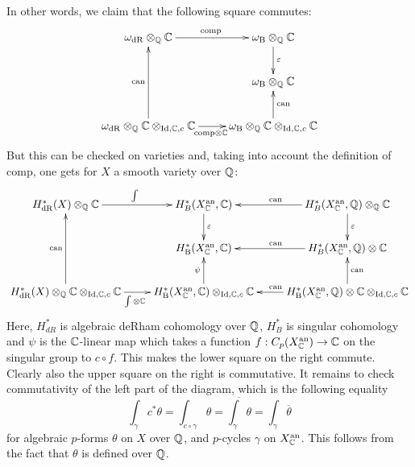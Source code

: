 In other words, we claim that the following square commutes:
\begin{equation*}
\xymatrix{\omega_{\mathrm{dR}}\otimes_{\Q}\C\ar[r]^{\mathrm{comp}}&\omega_{\mathrm{B}}\otimes_{\Q}\C\ar[d]^{\varepsilon}\\
&\omega_{\mathrm{B}}\otimes_{\Q}\C\\
\ar[uu]^{\mathrm{can}}\omega_{\mathrm{dR}}\otimes_{\Q}\C\otimes_{\mathrm{Id},\C,c}\C\ar[r]_{\mathrm{comp}\otimes\C}&\omega_{\mathrm{B}}\otimes_{\Q}\C\otimes_{\mathrm{Id},\C,c}\C\ar[u]_{\mathrm{can}}}
\end{equation*}
But this can be checked on varieties %
and, taking into account the definition of $\mathrm{comp}$, one
gets for $X$ a smooth variety over $\mathbb{Q}$:
\begin{equation*}
\xymatrix{H^{*}_{\mathrm{dR}}(X)\otimes_{\Q}\C\ar[r]^{\int}&H^{*}_{B}(X_{\C}^{\mathrm{an}},\C)\ar[d]^{\varepsilon}&H^{*}_{B}(X_{\C}^{\mathrm{an}},\Q)\otimes_{\Q}\C\ar[d]^{\varepsilon}\ar[l]_{\mathrm{can}}\\
&H^{*}_{\mathrm{B}}(X_{\C}^{\mathrm{an}},\C)&\ar[l]_{\mathrm{can}}H^{*}_{B}(X_{\C}^{\mathrm{an}},\Q)\otimes\C\\
\ar[uu]^{\mathrm{can}}H^{*}_{\mathrm{dR}}(X)\otimes_{\Q}\C\otimes_{\mathrm{Id},\C,c}\C\ar[r]_{\int\otimes\C}
&H^{*}_{\mathrm{B}}(X_{\C}^{\mathrm{an}},\C)\otimes_{\mathrm{Id},\C,c}\C\ar[u]^{\psi}&\ar[l]_{\mathrm{can}}H^{*}_{\mathrm{B}}(X_{\C}^{\mathrm{an}},\Q)\otimes\C\otimes_{\mathrm{Id},\C,c}\C\ar[u]_{\mathrm{can}}
}  
\end{equation*}
Here, $H^{*}_{dR}$ is algebraic deRham cohomology over $\mathbb{Q}$,
$H^{*}_{B}$ is singular cohomology and $\psi$ is the $\mathbb{C}$-linear map
which takes a function $f:C_{p}(X_{\mathbb{C}}^{\mathrm{an}})\to\mathbb{C}$ on the
singular group to $c\circ f$. This makes the lower square on the right
commute. Clearly also the upper square on the right is commutative. It
remains to check commutativity of the left part of the diagram, which
is the following equality
\begin{equation*}
  \int_{\gamma}c^{*}\theta=\int_{c\circ\gamma}\theta=\overline{\int_{\gamma}\theta}=\int_{\gamma}\overline{\theta}
\end{equation*}
for algebraic $p$-forms $\theta$ on $X$ over $\mathbb{Q}$, and $p$-cycles
$\gamma$ on $X_{\mathbb{C}}^{\mathrm{an}}$. This follows from the fact that
$\theta$ is defined over $\mathbb{Q}$.

